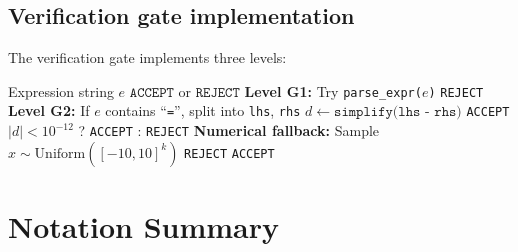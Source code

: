 \documentclass[11pt,a4paper]{article}
\newcommand{\cG}{\mathcal{G}}
\begin{document}
\subsection{Verification gate implementation}

The verification gate implements three levels:

\begin{algorithm}[H]
\caption{Verification Gate $\cG$
  \textup{[Three-Level Symbolic--Numeric Oracle]}}\label{alg:verify}
\begin{algorithmic}[1]
\Require Expression string $e$
\Ensure $\texttt{ACCEPT}$ or $\texttt{REJECT}$
\State \textbf{Level G1:} Try \texttt{parse\_expr($e$)}
  \State \Return \texttt{REJECT}
\EndIf
\State \textbf{Level G2:} If $e$ contains ``\texttt{=}'', split into \texttt{lhs}, \texttt{rhs}
\State $d \gets \texttt{simplify(lhs - rhs)}$
  \State \Return \texttt{ACCEPT} 
\EndIf
{}
  \State \Return $|d| < 10^{-12}$ ? \texttt{ACCEPT} : \texttt{REJECT}
\EndIf
\State \textbf{Numerical fallback:}
  \State Sample $x \sim \mathrm{Uniform}([-10, 10]^k)$
    \State \Return \texttt{REJECT}
  \EndIf
\EndFor
\State \Return \texttt{ACCEPT} 
\end{algorithmic}
\end{algorithm}

\section{Notation Summary}\label{app:notation}
\end{document}
